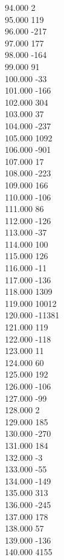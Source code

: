 { 94.000	2 \\
 95.000	119 \\
 96.000	-217 \\
 97.000	177 \\
 98.000	-164 \\
 99.000	91 \\
 100.000	-33 \\
 101.000	-166 \\
 102.000	304 \\
 103.000	37 \\
 104.000	-237 \\
 105.000	1092 \\
 106.000	-901 \\
 107.000	17 \\
 108.000	-223 \\
 109.000	166 \\
 110.000	-106 \\
 111.000	86 \\
 112.000	-126 \\
 113.000	-37 \\
 114.000	100 \\
 115.000	126 \\
 116.000	-11 \\
 117.000	-136 \\
 118.000	1309 \\
 119.000	10012 \\
 120.000	-11381 \\
 121.000	119 \\
 122.000	-118 \\
 123.000	11 \\
 124.000	60 \\
 125.000	192 \\
 126.000	-106 \\
 127.000	-99 \\
 128.000	2 \\
 129.000	185 \\
 130.000	-270 \\
 131.000	184 \\
 132.000	-3 \\
 133.000	-55 \\
 134.000	-149 \\
 135.000	313 \\
 136.000	-245 \\
 137.000	178 \\
 138.000	57 \\
 139.000	-136 \\
 140.000	4155 \\
}
